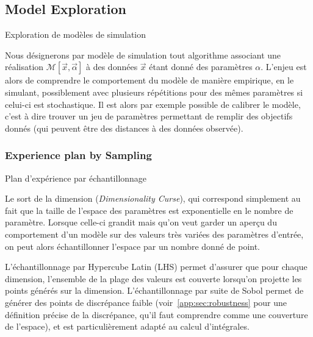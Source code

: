 





\subsection*{Model Exploration}{Exploration de modèles de simulation}

Nous désignerons par modèle de simulation tout algorithme associant une réalisation $\mathcal{M}\left[\vec{x},\vec{\alpha}\right]$ à des données $\vec{x}$ étant donné des paramètres $\alpha$. L'enjeu est alors de comprendre le comportement du modèle de manière empirique, en le simulant, possiblement avec plusieurs répétitions pour des mêmes paramètres si celui-ci est stochastique. Il est alors par exemple possible de calibrer le modèle, c'est à dire trouver un jeu de paramètres permettant de remplir des objectifs donnés (qui peuvent être des distances à des données observée).


\subsubsection*{Experience plan by Sampling}{Plan d'expérience par échantillonnage}

Le sort de la dimension (\emph{Dimensionality Curse}), qui correspond simplement au fait que la taille de l'espace des paramètres est exponentielle en le nombre de paramètre. Lorsque celle-ci grandit mais qu'on veut garder un aperçu du comportement d'un modèle sur des valeurs très variées des paramètres d'entrée, on peut alors échantillonner l'espace par un nombre donné de point.


L'échantillonnage par Hypercube Latin (LHS) permet d'assurer que pour chaque dimension, l'ensemble de la plage des valeurs est couverte lorsqu'on projette les points générés sur la dimension. L'échantillonnage par suite de Sobol permet de générer des points de discrépance faible (voir~\ref{app:sec:robustness} pour une définition précise de la discrépance, qu'il faut comprendre comme une couverture de l'espace), et est particulièrement adapté au calcul d'intégrales.


